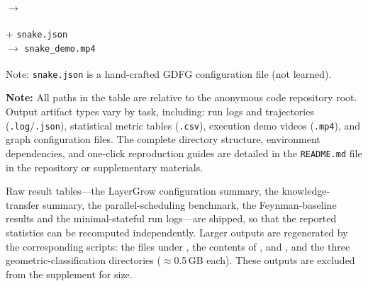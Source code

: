 \begin{table}[H]
\begin{description}[leftmargin=*, style=nextline, itemsep=5pt, parsep=2pt]
    \item[\textbf{Feynman Regression (Appx.~\ref{sec:appendix_baseline_comparison})}]
        \small
         \\
        $\rightarrow$ 

    \item[\textbf{Snake Controller (Appx.~\ref{app:snake_controller})}]
        \small
         + \texttt{snake.json}\textsuperscript{\dag} \\
        $\rightarrow$ \texttt{snake\_demo.mp4}

\end{description}

\vspace{1em}
\noindent\textsuperscript{\dag}\footnotesize{Note: \texttt{snake.json} is a hand-crafted GDFG configuration file (not learned).}

\end{table}



\noindent\textbf{Note:} All paths in the table are relative to the anonymous code repository root. Output artifact types vary by task, including: run logs and trajectories (\texttt{.log}/\texttt{.json}), statistical metric tables (\texttt{.csv}), execution demo videos (\texttt{.mp4}), and graph configuration files. The complete directory structure, environment dependencies, and one-click reproduction guides are detailed in the \texttt{README.md} file in the repository or supplementary materials.

Raw result tables---the LayerGrow configuration summary, the knowledge-transfer summary, the parallel-scheduling benchmark, the Feynman-baseline results and the minimal-stateful run logs---are shipped, so that the reported statistics can be recomputed independently. Larger outputs are regenerated by the corresponding scripts: the  files under , the contents of ,  and , and the three geometric-classification  directories ($\approx$0.5\,GB each). These outputs are excluded from the supplement for size.

